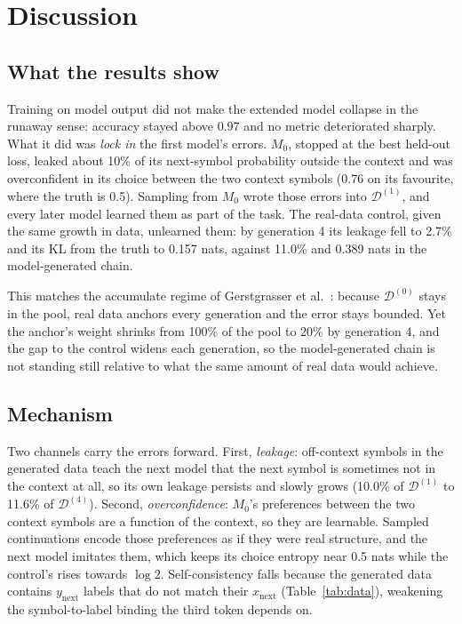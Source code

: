 \documentclass[11pt,a4paper]{article}
\newcommand{\xnext}{x_{\mathrm{next}}}
\newcommand{\ynext}{y_{\mathrm{next}}}
\newcommand{\data}[1]{\mathcal{D}^{(#1)}}
\begin{document}
\section{Discussion}\label{sec:discussion}

\subsection{What the results show}
Training on model output did not make the extended model collapse in the
runaway sense: accuracy stayed above 0.97 and no metric deteriorated sharply.
What it did was \emph{lock in} the first model's errors. $M_0$, stopped at the
best held-out loss, leaked about 10\% of its next-symbol probability outside
the context and was overconfident in its choice between the two context
symbols (0.76 on its favourite, where the truth is 0.5). Sampling from $M_0$
wrote those errors into $\data{1}$, and every later model learned them as part
of the task. The real-data control, given the same growth in data, unlearned
them: by generation 4 its leakage fell to 2.7\% and its KL from the truth to
0.157 nats, against 11.0\% and 0.389 nats in the model-generated chain.

This matches the accumulate regime of Gerstgrasser et
al.~\cite{gerstgrasser2024}: because $\data{0}$ stays in the pool, real data
anchors every generation and the error stays bounded. Yet the anchor's weight
shrinks from 100\% of the pool to 20\% by generation 4, and the gap to the
control widens each generation, so the model-generated chain is not standing
still relative to what the same amount of real data would achieve.

\subsection{Mechanism}
Two channels carry the errors forward. First, \emph{leakage}: off-context
symbols in the generated data teach the next model that the next symbol is
sometimes not in the context at all, so its own leakage persists and slowly
grows (10.0\% of $\data{1}$ to 11.6\% of $\data{4}$). Second,
\emph{overconfidence}: $M_0$'s preferences between the two context symbols are
a function of the context, so they are learnable. Sampled continuations
encode those preferences as if they were real structure, and the next model
imitates them, which keeps its choice entropy near 0.5 nats while the
control's rises towards $\log 2$. Self-consistency falls because the
generated data contains $\ynext$ labels that do not match their $\xnext$
(Table~\ref{tab:data}), weakening the symbol-to-label binding the third token
depends on.
\end{document}
